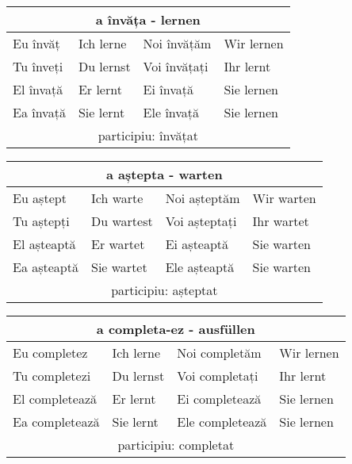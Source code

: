 \documentclass[11pt, oneside]{article}
\begin{document}
%
\begin{center}
  \begin{tabular}{ |p{3.25cm}|p{3.25cm}||p{3.25cm}|p{3.25cm}| }
      \hline
      \multicolumn{4}{|c|}{a învăța - lernen} \\
      \hline
      \hline
      Eu învăț & Ich lerne & Noi învățăm & Wir lernen\\
      \hline
      Tu înveți & Du lernst & Voi învățați & Ihr lernt\\
      \hline
      El învață & Er lernt & Ei învață & Sie lernen\\ 
      Ea învață & Sie lernt & Ele învață & Sie lernen\\
      \hline
      \multicolumn{4}{|c|}{participiu: învățat} \\
      \hline
     \end{tabular}
\end{center}
%
\begin{center}
  \begin{tabular}{ |p{3.25cm}|p{3.25cm}||p{3.25cm}|p{3.25cm}| }
      \hline
      \multicolumn{4}{|c|}{a aștepta - warten} \\
      \hline
      \hline
      Eu aștept & Ich warte & Noi așteptăm & Wir warten\\
      \hline
      Tu aștepți & Du wartest & Voi așteptați & Ihr wartet\\
      \hline
      El așteaptă & Er wartet & Ei așteaptă & Sie warten\\ 
      Ea așteaptă & Sie wartet & Ele așteaptă & Sie warten\\
      \hline
      \multicolumn{4}{|c|}{participiu: așteptat} \\
      \hline
     \end{tabular}
\end{center}
%
\begin{center}
  \begin{tabular}{ |p{3.25cm}|p{3.25cm}||p{3.25cm}|p{3.25cm}| }
      \hline
      \multicolumn{4}{|c|}{a completa-ez - ausfüllen} \\
      \hline
      \hline
      Eu completez & Ich lerne & Noi completăm & Wir lernen\\
      \hline
      Tu completezi & Du lernst & Voi completați & Ihr lernt\\
      \hline
      El completează & Er lernt & Ei completează & Sie lernen\\ 
      Ea completează & Sie lernt & Ele completează & Sie lernen\\
      \hline
      \multicolumn{4}{|c|}{participiu: completat} \\
      \hline
     \end{tabular}
\end{center}
\end{document}
